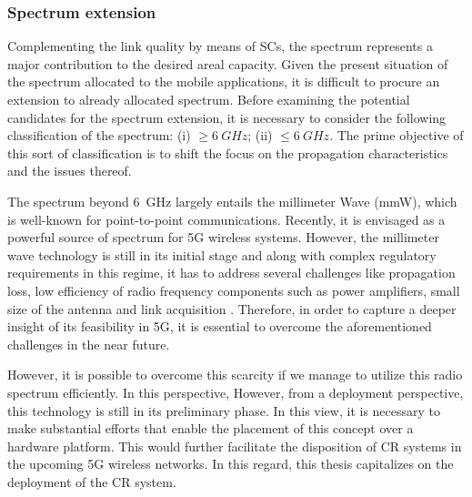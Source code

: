 \subsubsection*{Spectrum extension}
Complementing the link quality by means of SCs, the spectrum represents a major contribution to the desired areal capacity. Given the present situation of the spectrum allocated to the mobile applications, it is difficult to procure an extension to already allocated spectrum. Before examining the potential candidates for the spectrum extension, it is necessary to consider the following classification of the spectrum:
(i) $\ge \SI{6}{GHz}$;
(ii) $\le \SI{6}{GHz}$.
The prime objective of this sort of classification is to shift the focus on the propagation characteristics and the issues thereof.


The spectrum beyond \SI{6}{GHz} largely entails the millimeter Wave (mmW), which is well-known for point-to-point communications. Recently, it is envisaged as a powerful source of spectrum for 5G wireless systems. However, the millimeter wave technology is still in its initial stage and along with complex regulatory requirements in this regime, it has to address several challenges like propagation loss, low efficiency of radio frequency components such as power amplifiers, small size of the antenna and link acquisition \cite{Rapp13}. Therefore, in order to capture a deeper insight of its feasibility in 5G, it is essential to overcome the aforementioned challenges in the near future.

 However, it is possible to overcome this scarcity if we manage to utilize this radio spectrum efficiently. In this perspective,  However, from a deployment perspective, this technology is still in its preliminary phase. In this view, it is necessary to make substantial efforts that enable the placement of this concept over a hardware platform. This would further facilitate the disposition of CR systems in the upcoming 5G wireless networks. In this regard, this thesis capitalizes on the deployment of the CR system. 

